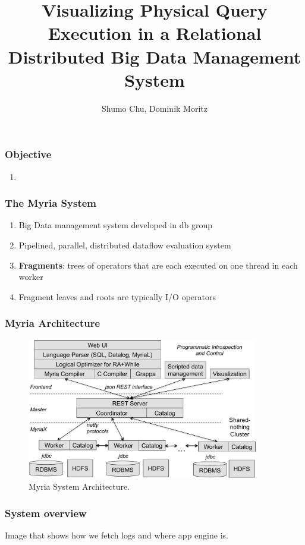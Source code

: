 \documentclass[xetex,mathserif,serif]{beamer}
\title[Query Visualization] %
{Visualizing Physical Query Execution in a Relational Distributed Big Data Management System}
\subtitle{}
\author[Chu, moritz] %
{Shumo Chu, Dominik Moritz}
\begin{document}
\begin{frame}
\titlepage

\end{frame}

\begin{frame}
\frametitle{Objective}
\begin{enumerate}
	\item 
\end{enumerate}
\end{frame}

\begin{frame}
\frametitle{The Myria System}
\begin{enumerate}
	\item Big Data management system developed in db group
	\item Pipelined, parallel, distributed dataflow evaluation system
	\item \textbf{Fragments}: trees of operators that are each executed on one thread in each worker
	\item Fragment leaves and roots are typically I/O operators
\end{enumerate}
\end{frame}

\begin{frame}
\frametitle{Myria Architecture}
\begin{figure}
 \begin{center}
     \includegraphics[width=0.9\textwidth]{arch}
   \end{center}
  \caption{Myria System Architecture.}
  \label{fig:myria_arc}
\end{figure}
\end{frame}

\begin{frame}
\frametitle{System overview}
Image that shows how we fetch logs and where app engine is.
\end{frame}
\end{document}
